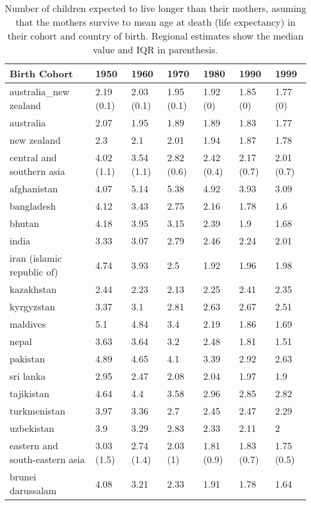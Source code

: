 \begin{table}

\caption{\label{tab:S9}Number of children expected to live longer than their mothers, asuming that the mothers survive to mean age at death (life expectancy) in their cohort and country of birth. Regional estimates show the median value and IQR in parenthesis.}
\centering
\begin{tabular}[t]{lllllll}
\toprule
Birth Cohort & 1950 & 1960 & 1970 & 1980 & 1990 & 1999\\
\midrule
australia\_new zealand & 2.19 (0.1) & 2.03 (0.1) & 1.95 (0.1) & 1.92 (0) & 1.85 (0) & 1.77 (0)\\
australia & 2.07 & 1.95 & 1.89 & 1.89 & 1.83 & 1.77\\
new zealand & 2.3 & 2.1 & 2.01 & 1.94 & 1.87 & 1.78\\
central and southern asia & 4.02 (1.1) & 3.54 (1.1) & 2.82 (0.6) & 2.42 (0.4) & 2.17 (0.7) & 2.01 (0.7)\\
afghanistan & 4.07 & 5.14 & 5.38 & 4.92 & 3.93 & 3.09\\
\addlinespace
bangladesh & 4.12 & 3.43 & 2.75 & 2.16 & 1.78 & 1.6\\
bhutan & 4.18 & 3.95 & 3.15 & 2.39 & 1.9 & 1.68\\
india & 3.33 & 3.07 & 2.79 & 2.46 & 2.24 & 2.01\\
iran (islamic republic of) & 4.74 & 3.93 & 2.5 & 1.92 & 1.96 & 1.98\\
kazakhstan & 2.44 & 2.23 & 2.13 & 2.25 & 2.41 & 2.35\\
\addlinespace
kyrgyzstan & 3.37 & 3.1 & 2.81 & 2.63 & 2.67 & 2.51\\
maldives & 5.1 & 4.84 & 3.4 & 2.19 & 1.86 & 1.69\\
nepal & 3.63 & 3.64 & 3.2 & 2.48 & 1.81 & 1.51\\
pakistan & 4.89 & 4.65 & 4.1 & 3.39 & 2.92 & 2.63\\
sri lanka & 2.95 & 2.47 & 2.08 & 2.04 & 1.97 & 1.9\\
\addlinespace
tajikistan & 4.64 & 4.4 & 3.58 & 2.96 & 2.85 & 2.82\\
turkmenistan & 3.97 & 3.36 & 2.7 & 2.45 & 2.47 & 2.29\\
uzbekistan & 3.9 & 3.29 & 2.83 & 2.33 & 2.11 & 2\\
eastern and south-eastern asia & 3.03 (1.5) & 2.74 (1.4) & 2.03 (1) & 1.81 (0.9) & 1.83 (0.7) & 1.75 (0.5)\\
brunei darussalam & 4.08 & 3.21 & 2.33 & 1.91 & 1.78 & 1.64\\

\end{tabular}
\end{table}
